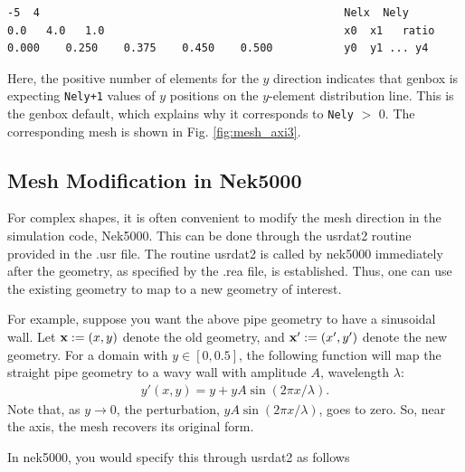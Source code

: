 \begin{verbatim}
-5  4                                               Nelx  Nely
0.0   4.0   1.0                                     x0  x1   ratio
0.000    0.250    0.375    0.450    0.500           y0  y1 ... y4
\end{verbatim}

\noindent
Here, the positive number of elements for the $y$ direction indicates
that genbox is expecting {\tt Nely+1} values of $y$ positions on the
$y$-element distribution line.   This is the genbox default, which
explains why it corresponds to {\tt Nely} $>$ 0.  The corresponding mesh
is shown in Fig. \ref{fig:mesh_axi3}.


\subsection{Mesh Modification in Nek5000}

For complex shapes, it is often convenient to modify the mesh
direction in the simulation code, Nek5000.  This can be done
through the usrdat2 routine provided in the .usr file.
The routine usrdat2 is called by nek5000 immediately after
the geometry, as specified by the .rea file, is established.
Thus, one can use the existing geometry to map to a new geometry
of interest.

For example, suppose you want the above pipe geometry to have
a sinusoidal wall.  Let ${\bf x} := (x,y)$ denote the old geometry,
and ${\bf x}' := (x',y')$ denote the new geometry.  For a domain
with $y\in [0,0.5]$, the following function will map the straight
pipe geometry to a wavy wall with amplitude $A$, wavelength $\lambda$:
\begin{eqnarray*}
y'(x,y) = y  + y A \sin( 2 \pi x / \lambda ).
\end{eqnarray*}
Note that, as $y \longrightarrow 0$, the perturbation, 
$yA \sin( 2 \pi x / \lambda )$, goes to zero.  So, near the axis,
the mesh recovers its original form.

In nek5000, you would specify this through usrdat2 as follows


